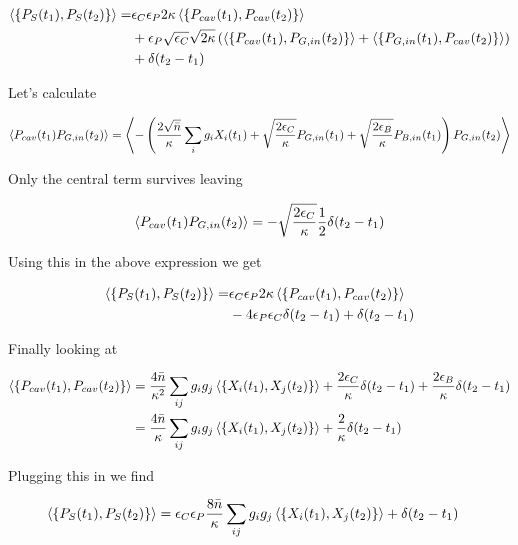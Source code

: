 \documentclass[12pt]{article}
\newcommand{\ep}{\epsilon}
\begin{document}
\begin{align}
\Braket{\left\{P_S(t_1), P_S(t_2)\right\}} =& \epsilon_C \epsilon_P 2\kappa \Braket{\left\{P_{cav}(t_1), P_{cav}(t_2)\right\}} \\
&+ \epsilon_P\sqrt{\epsilon_C}\sqrt{2\kappa}\left(\Braket{\left\{P_{cav}(t_1), P_{G,in}(t_2)\right\}} + \Braket{\left\{P_{G,in}(t_1), P_{cav}(t_2)\right\}}\right)\\
&+\delta(t_2-t_1)
\end{align}

Let's calculate

\begin{align}
\Braket{P_{cav}(t_1)P_{G,in}(t_2)} = \Braket{-\left(\frac{2\sqrt{\bar{n}}}{\kappa} \sum_i g_i X_i(t_1) + \sqrt{\frac{2\epsilon_C}{\kappa}} P_{G,in}(t_1) + \sqrt{\frac{2\epsilon_B}{\kappa}}P_{B,in}(t_1) \right)P_{G,in}(t_2)}
\end{align}

Only the central term survives leaving

\begin{align}
\Braket{P_{cav}(t_1)P_{G,in}(t_2)} = -\sqrt{\frac{2\ep_C}{\kappa}} \frac{1}{2}\delta(t_2-t_1)
\end{align}

Using this in the above expression we get

\begin{align}
\Braket{\left\{P_S(t_1), P_S(t_2)\right\}} =& \ep_C \ep_P 2\kappa \Braket{\left\{P_{cav}(t_1), P_{cav}(t_2)\right\}}\\
&- 4\ep_P \ep_C\delta(t_2-t_1) +  \delta(t_2-t_1)
\end{align}

Finally looking at

\begin{align}
\Braket{\left\{P_{cav}(t_1),P_{cav}(t_2)\right\}} &= \frac{4\bar{n}}{\kappa^2}\sum_{ij}g_ig_j \Braket{\left\{X_i(t_1),X_j(t_2)\right\}} + \frac{2\ep_C}{\kappa} \delta(t_2-t_1) + \frac{2\ep_B}{\kappa} \delta(t_2-t_1)\\
&= \frac{4\bar{n}}{\kappa} \sum_{ij}g_ig_j\Braket{\left\{X_i(t_1), X_j(t_2)\right\}} + \frac{2}{\kappa}\delta(t_2-t_1)
\end{align}

Plugging this in we find

\begin{align}
\Braket{\left\{P_S(t_1),P_S(t_2)\right\}} &= \ep_C\ep_P \frac{8\bar{n}}{\kappa}\sum_{ij} g_ig_j\Braket{\left\{X_i(t_1),X_j(t_2)\right\}} + \delta(t_2-t_1)
\end{align}
\end{document}

